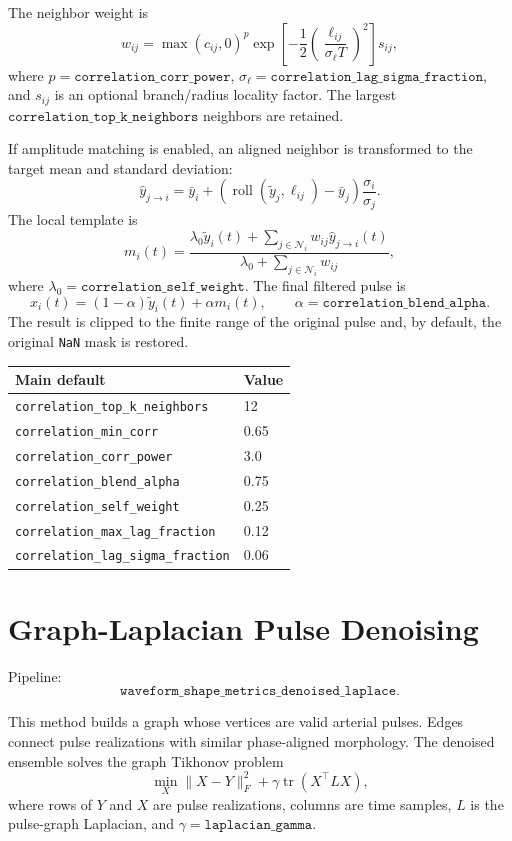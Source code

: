 \documentclass[11pt]{article}
\begin{document}
The neighbor weight is
\[
    w_{ij}
    =
    \max(c_{ij},0)^p
    \exp\left[-\frac{1}{2}
        \left(\frac{\ell_{ij}}{\sigma_{\ell}T}\right)^2\right]
    s_{ij},
\]
where \(p=\texttt{correlation\_corr\_power}\),
\(\sigma_{\ell}=\texttt{correlation\_lag\_sigma\_fraction}\), and \(s_{ij}\)
is an optional branch/radius locality factor.  The largest
\(\texttt{correlation\_top\_k\_neighbors}\) neighbors are retained.

If amplitude matching is enabled, an aligned neighbor is transformed to the
target mean and standard deviation:
\[
    \hat y_{j\rightarrow i}
    =
    \bar y_i+
    \left(\operatorname{roll}(\tilde y_j,\ell_{ij})-\bar y_j\right)
    \frac{\sigma_i}{\sigma_j}.
\]
The local template is
\[
    m_i(t)=
    \frac{\lambda_0\tilde y_i(t)+
    \sum_{j\in\mathcal{N}_i}w_{ij}\hat y_{j\rightarrow i}(t)}
    {\lambda_0+\sum_{j\in\mathcal{N}_i}w_{ij}},
\]
where \(\lambda_0=\texttt{correlation\_self\_weight}\).  The final filtered
pulse is
\[
    x_i(t)=(1-\alpha)\tilde y_i(t)+\alpha m_i(t),
    \qquad
    \alpha=\texttt{correlation\_blend\_alpha}.
\]
The result is clipped to the finite range of the original pulse and, by
default, the original \texttt{NaN} mask is restored.

\begin{tabular}{@{}ll@{}}
\toprule
Main default & Value \\
\midrule
\texttt{correlation\_top\_k\_neighbors} & 12 \\
\texttt{correlation\_min\_corr} & 0.65 \\
\texttt{correlation\_corr\_power} & 3.0 \\
\texttt{correlation\_blend\_alpha} & 0.75 \\
\texttt{correlation\_self\_weight} & 0.25 \\
\texttt{correlation\_max\_lag\_fraction} & 0.12 \\
\texttt{correlation\_lag\_sigma\_fraction} & 0.06 \\
\bottomrule
\end{tabular}

\section{Graph-Laplacian Pulse Denoising}

Pipeline:
\[
    \texttt{waveform\_shape\_metrics\_denoised\_laplace}.
\]

This method builds a graph whose vertices are valid arterial pulses.  Edges
connect pulse realizations with similar phase-aligned morphology.  The
denoised ensemble solves the graph Tikhonov problem
\[
    \min_X \|X-Y\|_F^2+\gamma\operatorname{tr}(X^\top L X),
\]
where rows of \(Y\) and \(X\) are pulse realizations, columns are time samples,
\(L\) is the pulse-graph Laplacian, and
\(\gamma=\texttt{laplacian\_gamma}\).
\end{document}
